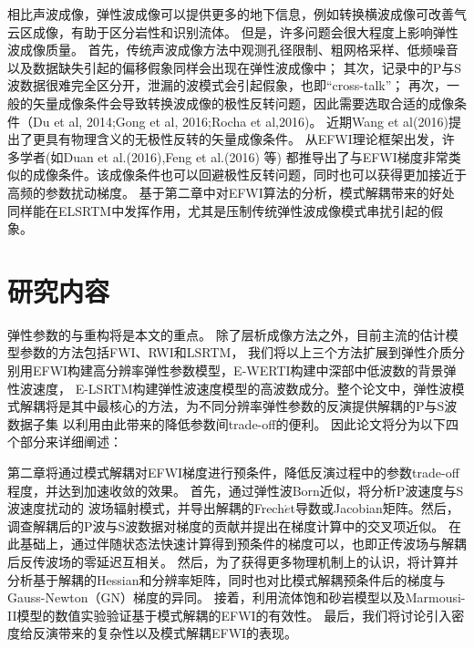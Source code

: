 相比声波成像，弹性波成像可以提供更多的地下信息，例如转换横波成像可改善气云区成像，有助于区分岩性和识别流体。
但是，许多问题会很大程度上影响弹性波成像质量。
首先，传统声波成像方法中观测孔径限制、粗网格采样、低频噪音以及数据缺失引起的偏移假象同样会出现在弹性波成像中；
其次，记录中的P与S波数据很难完全区分开，泄漏的波模式会引起假象，也即“cross-talk”；
再次，一般的矢量成像条件会导致转换波成像的极性反转问题，因此需要选取合适的成像条件（Du et al,
2014\cite{DuEtAl2014};Gong et al, 2016\cite{GongEtAl2016};Rocha et al,2016\cite{RochaEtAl2016a})。
近期Wang et al(2016)\cite{WangChenlongEtAl2016}提出了更具有物理含义的无极性反转的矢量成像条件。
从EFWI理论框架出发，许多学者(如Duan et al.(2016)\cite{Duan2016},Feng et al.(2016)\cite{Feng2016} 等)
都推导出了与EFWI梯度非常类似的成像条件。该成像条件也可以回避极性反转问题，同时也可以获得更加接近于高频的参数扰动梯度。
基于第二章中对EFWI算法的分析，模式解耦带来的好处同样能在ELSRTM中发挥作用，尤其是压制传统弹性波成像模式串扰引起的假象。


\section{研究内容}
弹性参数的与重构将是本文的重点。
除了层析成像方法之外，目前主流的估计模型参数的方法包括FWI、RWI和LSRTM，
我们将以上三个方法扩展到弹性介质分别用EFWI构建高分辨率弹性参数模型，E-WERTI构建中深部中低波数的背景弹性波速度，
E-LSRTM构建弹性波速度模型的高波数成分。整个论文中，弹性波模式解耦将是其中最核心的方法，为不同分辨率弹性参数的反演提供解耦的P与S波数据子集
以利用由此带来的降低参数间trade-off的便利。
因此论文将分为以下四个部分来详细阐述：

第二章将通过模式解耦对EFWI梯度进行预条件，降低反演过程中的参数trade-off程度，并达到加速收敛的效果。
首先，通过弹性波Born近似，将分析P波速度与S波速度扰动的
波场辐射模式，并导出解耦的Frech{$\acute{e}$}t导数或Jacobian矩阵。然后，调查解耦后的P波与S波数据对梯度的贡献并提出在梯度计算中的交叉项近似。
在此基础上，通过伴随状态法快速计算得到预条件的梯度可以\cite[]{plessix2006}，也即正传波场与解耦后反传波场的零延迟互相关。
然后，为了获得更多物理机制上的认识，将计算并分析基于解耦的Hessian和分辨率矩阵，同时也对比模式解耦预条件后的梯度与Gauss-Newton（GN）梯度的异同。
接着，利用流体饱和砂岩模型以及Marmousi-II模型的数值实验验证基于模式解耦的EFWI的有效性。
最后，我们将讨论引入密度给反演带来的复杂性以及模式解耦EFWI的表现。

